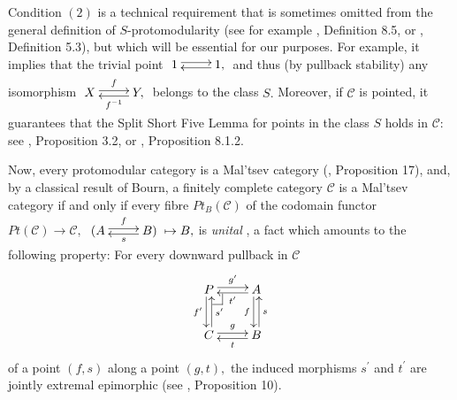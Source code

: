 \documentclass[11pt]{amsart}
\makeatletter
\theoremstyle{plain}
\theoremstyle{definition}
\theoremstyle{remark}
\newcommand{\pullback}[4]{{#1 \leftindex_{#2}{\times}_{#3} #4}}
\def\pullback{%
 \ar@{-}[]+R+<4pt,-3pt>;[]+RD+<4pt,-6pt>%
 \ar@{-}[]+D+<3pt,-6pt>;[]+RD+<4pt,-6pt>}
\def\pullback{%
 \ar@{-}[]+R+<4pt,-3pt>;[]+RD+<4pt,-6pt>%
 \ar@{-}[]+D+<3pt,-6pt>;[]+RD+<4pt,-6pt>}
\makeatother
\begin{document}
Condition $(2)$ is a technical requirement that is sometimes omitted from the general definition of $S$-protomodularity (see for example \cite{partial}, Definition 8.5, or \cite{3x3}, Definition 5.3), but which will be essential for our purposes. For example, it implies that the trivial point $\xymatrix{1 \ar@<.5ex>[r] &{1,} \ar@<.5ex>[l]}$ and thus (by pullback stability) any isomorphism $\xymatrix{X \ar@<.5ex>[r]^-f &{Y,} \ar@<.5ex>[l]^-{f^{-1}}}$ belongs to the class $S.$ Moreover, if $\mathcal{C}$ is pointed, it guarantees that the Split Short Five Lemma for points in the class $S$ holds in $\mathcal{C}$: see \cite{S-protomodular}, Proposition 3.2, or \cite{schreier_book}, Proposition 8.1.2.

Now, every protomodular category is a Mal'tsev category (\cite{bourn96}, Proposition 17), and, by a classical result of Bourn, a finitely complete category $\mathcal{C}$ is a Mal'tsev category if and only if every fibre $Pt_B(\mathcal{C})$ of the codomain functor $Pt(\mathcal{C})\rightarrow\mathcal{C},$ $\xymatrix{{(A} \ar@<.5ex>[r]^-f &{B)} \ar@<.5ex>[l]^-s }\mapsto B,$ is \emph{unital} \cite{bourn96}, a fact which amounts to the following property: For every downward pullback in $\mathcal{C}$
\begin{equation}
\begin{aligned}
\label{eqn:point-product}
\xymatrix{
P \pullback \ar@<.5ex>[r]^-{g^\prime} \ar@<-.5ex>[d]_-{f^\prime} &A \ar@<.5ex>[l]^{t^\prime} \ar@<-.5ex>[d]_-f \\
C \ar@<.5ex>[r]^-g \ar@<-.5ex>[u]_-{s^\prime} &B \ar@<.5ex>[l]^t \ar@<-.5ex>[u]_-s
}
\end{aligned}
\end{equation}
of a point $(f,s)$ along a point $(g,t),$ the induced morphisms $s^\prime$ and $t^\prime$ are jointly extremal epimorphic (see \cite{bourn96}, Proposition 10).
\end{document}
